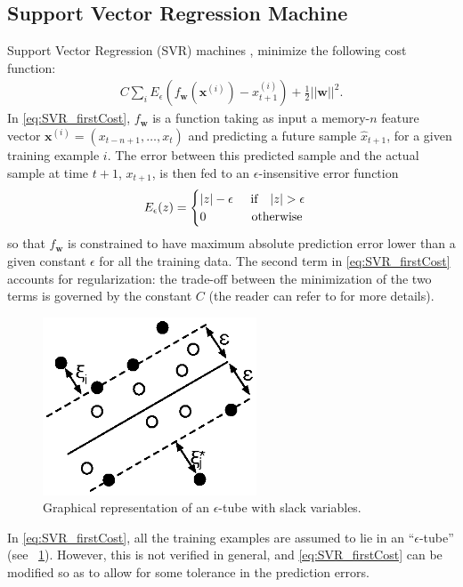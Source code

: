 \documentclass[conference, a4paper]{IEEEtran}
\begin{document}
\subsection{Support Vector Regression Machine}
Support Vector Regression (SVR) machines \cite{Vapnik1995, Drucker1997}, minimize the following cost function:
\begin{align}\label{eq:SVR_firstCost}
C \sum_i E_\epsilon(f_{\mathbf{w}}(\mathbf{x}^{(i)})-x_{t+1}^{(i)}) + \frac{1}{2} ||\mathbf{w}||^2.
\end{align}
In \eqref{eq:SVR_firstCost}, $f_{\mathbf{w}}$ is a function taking as input a memory-$n$ feature vector $\mathbf{x}^{(i)} = \left(x_{t-n+1}, \dots, x_t \right)$ and predicting a future sample $\hat x_{t+1}$, for a given training example $i$. The error between this predicted sample and the actual sample at time $t+1$, $x_{t+1}$, is then fed to an $\epsilon$-insensitive error function 
\begin{align}
E_\epsilon(z) = 
\begin{cases}
|z|-\epsilon  \hspace{0.5cm} \text{if} \quad |z| > \epsilon \\
0 \hspace{1.3cm} \text{otherwise}
\end{cases}
\end{align}
so that $f_{\mathbf{w}}$ is constrained to have maximum absolute prediction error lower than a given constant $\epsilon$ for all the training data. The second term in \eqref{eq:SVR_firstCost} accounts for regularization: the trade-off between the minimization of the two terms is governed by the constant $C$ (the reader can refer to \cite{Smola2004,Cortes1995} for more details).
\begin{figure}[!ht]
	\centering
	\includegraphics[width=2.5in]{./graphics/SVR.eps}
	\caption{Graphical representation of an $\epsilon$-tube with slack variables.}
	\label{fig:svr}
\end{figure}
In \eqref{eq:SVR_firstCost}, all the training examples are assumed to lie in an  ``$\epsilon$-tube'' (see \figurename~\ref{fig:svr}). However, this is not verified in general, and \eqref{eq:SVR_firstCost} can be modified so as to allow for some tolerance in the prediction errors.
\end{document}
